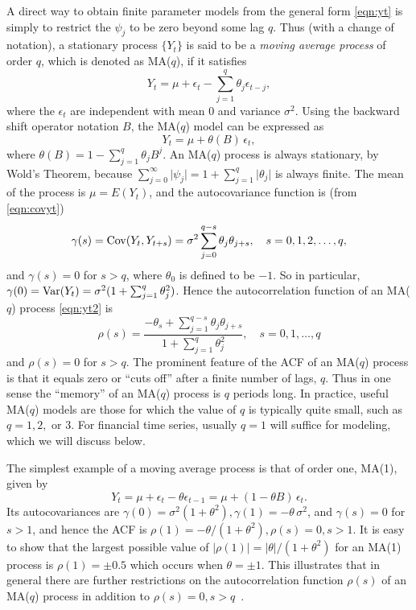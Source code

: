 A direct way to obtain finite parameter models from the general form \eqref{eqn:yt} is simply to restrict the $\psi_j$ to be zero beyond some lag $q$. Thus (with a change of notation), a stationary process $\{ Y_t \}$ is said to be a \emph{moving average process} of order $q$, which is denoted as MA($q$), if it satisfies
	\begin{equation} \label{eqn:yt2}
	Y_t = \mu + \epsilon_t - \sum_{j=1}^{q} \theta_j \epsilon_{t-j},
	\end{equation}
where the $\epsilon_t$ are independent with mean 0 and variance $\sigma^2$. Using the backward shift operator notation $B$, the MA($q$) model can be expressed as
	\begin{equation*}
         Y_t= \mu + \theta(B) \, \epsilon_t,	
	\end{equation*}
where $\theta(B) = 1 - \sum_{j=1}^q \theta_j B^j$.  An MA($q$)  process is always stationary, by Wold's Theorem, because $\sum_{j=0}^{\infty} \lvert \psi_j \rvert= 1 + \sum_{j=1}^q \lvert \theta_j \rvert$ is always finite. The mean of the process is $\mu = E(Y_t)$, and the autocovariance function is (from \eqref{eqn:covyt})
	\begin{equation*}
            \gamma(s)= \operatorname{Cov} (Y_t, Y_{t+s})= \sigma^2 \sum_{j=0}^{q-s} \theta_j \theta_{j+s}, \quad s = 0, 1, 2, \ldots, q,	
	\end{equation*}
and $\gamma(s)= 0$ for $s > q$, where $\theta_0$ is defined to be $-1$. So in particular, $\gamma(0)=  \operatorname{Var}(Y_t) = \sigma^2 (1 + \sum_{j=1}^q \theta_j^2)$. Hence the autocorrelation function of an MA($q$) process \eqref{eqn:yt2} is
       \begin{equation} \label{eqn:rhos}
	\rho(s) = \dfrac{-\theta_s + \sum_{j=1}^{q-s} \theta_j \theta_{j+s}}{1 + \sum_{j=1}^q \theta_j^2}, \quad s = 0,1,\ldots, q
       \end{equation}
and $\rho(s)= 0$ for $s > q$. The prominent feature of the ACF of an MA($q$) process is that it equals zero or ``cuts off'' after a finite number of lags, $q$. Thus in one sense the ``memory'' of an MA($q$) process is $q$ periods long. In practice, useful MA($q$) models are those for which the value of $q$ is typically quite small, such as $q= 1, 2,$ or $3$.  For financial time series, usually $q= 1$ will suffice for modeling, which we will discuss below. 


\begin{ex} \label{ex:movingorder1}
The simplest example of a moving average process is that of order one, MA(1), given by
	\[
	Y_t = \mu + \epsilon_t - \theta \epsilon_{t-1}= \mu + (1 - \theta B)\, \epsilon_t.
	 \]
Its autocovariances are $\gamma(0)= \sigma^2 (1 + \theta^2), \gamma(1)= -\theta\, \sigma^2$, and $\gamma(s)= 0$ for $s > 1$, and hence the ACF is $\rho(1)= -\theta / (1+\theta^2), \rho(s)= 0, s > 1$. It is easy to show that the largest possible value of $\left| \rho(1) \right|= \left| \theta \right| / (1+\theta^2)$ for an  MA(1) process is $\rho(1)= \pm 0.5$ which occurs when $\theta = \pm 1$. This illustrates that in general there are further restrictions on the autocorrelation function $\rho(s)$ of an MA($q$)  process in addition to $\rho(s)= 0, s > q$~.~\xqed
\end{ex}
    

